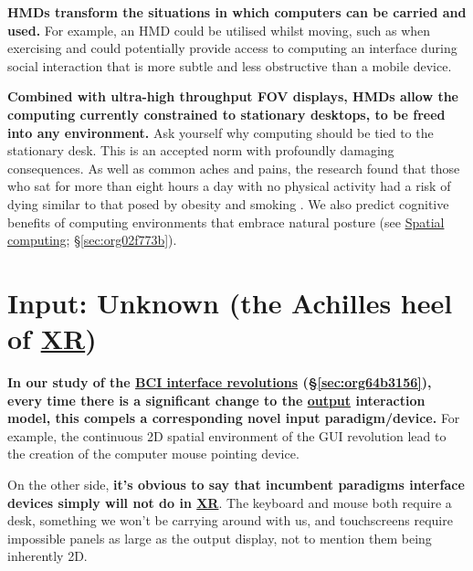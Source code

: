 \documentclass[logo,bsc,singlespacing,parskip]{infthesis}
\begin{document}
\textbf{HMDs transform the situations in which computers can be carried and used.}
For example, an HMD could be utilised whilst moving, such as when exercising and could potentially provide access to computing an interface during social interaction that is more subtle and less obstructive than a mobile device.

\textbf{Combined with ultra-high throughput FOV displays, HMDs allow the computing currently constrained to stationary desktops, to be freed into any environment.}
Ask yourself why computing should be tied to the stationary desk.
This is an accepted norm with profoundly damaging consequences.
As well as common aches and pains, the research found that those who sat for more than eight hours a day with no physical activity had a risk of dying similar to that posed by obesity and smoking \autocite{laskowskiSittingRisksHow}.
We also predict cognitive benefits of computing environments that embrace natural posture (see \hyperref[sec:org02f773b]{Spatial computing}; \S \ref{sec:org02f773b}).

\section{Input: Unknown (the Achilles heel of \hyperref[org1d567af]{XR})}
\label{sec:org978b247}
\textbf{In our study of the \hyperref[sec:org64b3156]{BCI interface revolutions} (\S \ref{sec:org64b3156}), every time there is a significant change to the \hyperref[output]{output} interaction model, this compels a corresponding novel input paradigm/device.}
For example, the continuous 2D spatial environment of the GUI revolution lead to the creation of the computer mouse pointing device.

On the other side, \textbf{it's obvious to say that incumbent paradigms interface devices simply will not do in \hyperref[org1d567af]{XR}}.
The keyboard and mouse both require a desk, something we won't be carrying around with us, and touchscreens require impossible panels as large as the output display, not to mention them being inherently 2D.
\end{document}
